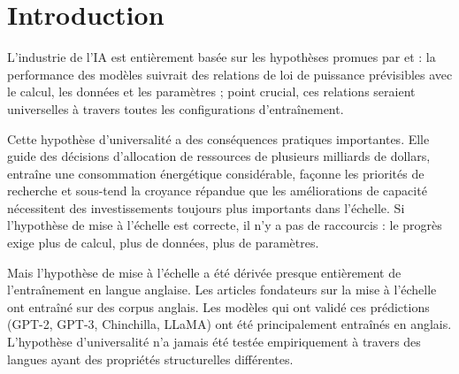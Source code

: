 \documentclass[11pt,a4paper]{article}
\begin{document}
\begin{abstract}
\medskip
\noindent\textbf{Note :} Les expériences pré-enregistrées à 350M paramètres sont terminées mais non concluantes en raison de contraintes de taille de lot. Le français 350M n'a atteint que 70\% de précision après 819M tokens (4$\times$ les tokens nécessaires à l'émergence du français 125M), suggérant que l'échelle pourrait être contre-productive pour les langues morphologiquement riches. L'anglais 350M est resté à 40\% de précision. Nous relançons les expériences 350M jusqu'à 3,3B tokens pour permettre une comparaison équitable. Journaux d'entraînement : \url{https://github.com/adamzwasserman/fractal-language}

\medskip
\noindent\textbf{Mots-clés :} lois de mise à l'échelle, modèles de langage, morphologie, interlinguistique, émergence, dynamiques d'entraînement
\end{abstract}

\section{Introduction}

L'industrie de l'IA est entièrement basée sur les hypothèses promues par \citet{kaplan2020scaling} et \citet{hoffmann2022training} : la performance des modèles suivrait des relations de loi de puissance prévisibles avec le calcul, les données et les paramètres ; point crucial, ces relations seraient universelles à travers toutes les configurations d'entraînement.

Cette hypothèse d'universalité a des conséquences pratiques importantes. Elle guide des décisions d'allocation de ressources de plusieurs milliards de dollars, entraîne une consommation énergétique considérable, façonne les priorités de recherche et sous-tend la croyance répandue que les améliorations de capacité nécessitent des investissements toujours plus importants dans l'échelle. Si l'hypothèse de mise à l'échelle est correcte, il n'y a pas de raccourcis : le progrès exige plus de calcul, plus de données, plus de paramètres.

Mais l'hypothèse de mise à l'échelle a été dérivée presque entièrement de l'entraînement en langue anglaise. Les articles fondateurs sur la mise à l'échelle \citep{kaplan2020scaling, hoffmann2022training} ont entraîné sur des corpus anglais. Les modèles qui ont validé ces prédictions (GPT-2, GPT-3, Chinchilla, LLaMA) ont été principalement entraînés en anglais. L'hypothèse d'universalité n'a jamais été testée empiriquement à travers des langues ayant des propriétés structurelles différentes.
\end{document}
